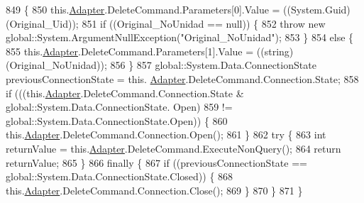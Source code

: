 \begin{DoxyCode}
849                                                                                       \{
850             this.\hyperlink{class_proyecto___integrador__3_1_1ds_unidad_table_adapters_1_1_unidad_table_adapter_a85041318aa5a0582ef54f4af0d332411}{Adapter}.DeleteCommand.Parameters[0].Value = ((System.Guid)(Original\_Uid));
851             \textcolor{keywordflow}{if} ((Original\_NoUnidad == null)) \{
852                 \textcolor{keywordflow}{throw} \textcolor{keyword}{new} global::System.ArgumentNullException(\textcolor{stringliteral}{"Original\_NoUnidad"});
853             \}
854             \textcolor{keywordflow}{else} \{
855                 this.\hyperlink{class_proyecto___integrador__3_1_1ds_unidad_table_adapters_1_1_unidad_table_adapter_a85041318aa5a0582ef54f4af0d332411}{Adapter}.DeleteCommand.Parameters[1].Value = ((string)(Original\_NoUnidad));
856             \}
857             global::System.Data.ConnectionState previousConnectionState = this.
      \hyperlink{class_proyecto___integrador__3_1_1ds_unidad_table_adapters_1_1_unidad_table_adapter_a85041318aa5a0582ef54f4af0d332411}{Adapter}.DeleteCommand.Connection.State;
858             \textcolor{keywordflow}{if} (((this.\hyperlink{class_proyecto___integrador__3_1_1ds_unidad_table_adapters_1_1_unidad_table_adapter_a85041318aa5a0582ef54f4af0d332411}{Adapter}.DeleteCommand.Connection.State & global::System.Data.ConnectionState.
      Open) 
859                         != global::System.Data.ConnectionState.Open)) \{
860                 this.\hyperlink{class_proyecto___integrador__3_1_1ds_unidad_table_adapters_1_1_unidad_table_adapter_a85041318aa5a0582ef54f4af0d332411}{Adapter}.DeleteCommand.Connection.Open();
861             \}
862             \textcolor{keywordflow}{try} \{
863                 \textcolor{keywordtype}{int} returnValue = this.\hyperlink{class_proyecto___integrador__3_1_1ds_unidad_table_adapters_1_1_unidad_table_adapter_a85041318aa5a0582ef54f4af0d332411}{Adapter}.DeleteCommand.ExecuteNonQuery();
864                 \textcolor{keywordflow}{return} returnValue;
865             \}
866             \textcolor{keywordflow}{finally} \{
867                 \textcolor{keywordflow}{if} ((previousConnectionState == global::System.Data.ConnectionState.Closed)) \{
868                     this.\hyperlink{class_proyecto___integrador__3_1_1ds_unidad_table_adapters_1_1_unidad_table_adapter_a85041318aa5a0582ef54f4af0d332411}{Adapter}.DeleteCommand.Connection.Close();
869                 \}
870             \}
871         \}
\end{DoxyCode}
